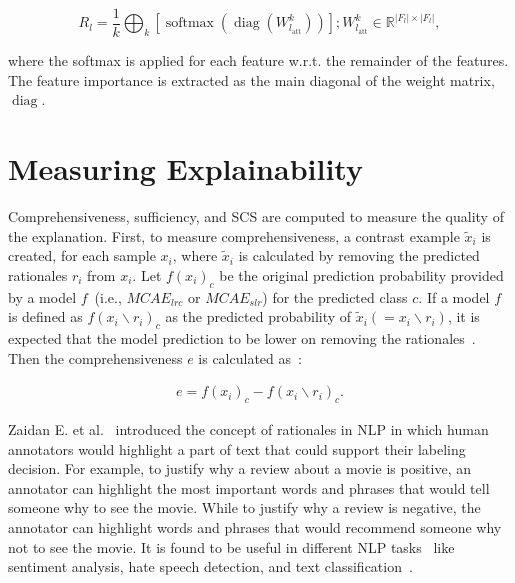 \begin{equation}
    R_{l}=\frac{1}{k} \bigoplus_{k}\left[\operatorname{softmax}\left(\operatorname{diag}\left(W_{l_{\mathrm{att}}}^{k}\right)\right)\right] ; W_{l_{\mathrm{att}}}^{k} \in \mathbb{R}^{|F_l| \times|F_l|},
\end{equation}

\hspace*{3.5mm} where the softmax is applied for each feature w.r.t. the remainder of the features. The feature importance is extracted as the main diagonal of the weight matrix, $\operatorname{diag}$. 


\section{Measuring Explainability}
Comprehensiveness, sufficiency, and SCS are computed to measure the quality of the explanation. First, to measure comprehensiveness, a contrast example $\tilde{x}_{i}$ is created, for each sample $x_{i}$, where $\tilde{x}_{i}$ is calculated by removing the predicted rationales $r_{i}$ from $x_{i}$. Let $f\left(x_{i}\right)_{c}$ be the original prediction probability provided by a model $f$~(i.e., $MCAE_{lrc}$ or $MCAE_{slr}$) for the predicted class $c$. If a model $f$ is defined as $f\left(x_{i} \backslash r_{i}\right)_{c}$ as the predicted probability of $\tilde{x}_{i}\left(=x_{i} \backslash r_{i}\right)$, it is expected that the model prediction to be lower on removing the rationales~\cite{deyoung2019eraser}. Then the comprehensiveness $e$ is calculated as~\cite{deyoung2019eraser}: 

\begin{align}
    e  = f\left(x_{i}\right)_{c}-f\left(x_{i} \backslash r_{i}\right)_{c}.
\end{align}

\hspace*{3.5mm} Zaidan E. et al.~\cite{zaidan2007using} introduced the concept of rationales in NLP in which human annotators would highlight a part of text that could support their labeling decision. For example, to justify why a review about a movie is positive, an annotator can highlight the most important words and phrases that would tell someone why to see the movie. While to justify why a review is negative, the annotator can highlight words and phrases that would recommend someone why not to see the movie. It is found to be useful in different NLP tasks~\cite{deyoung2019eraser} like sentiment analysis, hate speech detection, and text classification~\cite{herrewijnenmachine}. 

